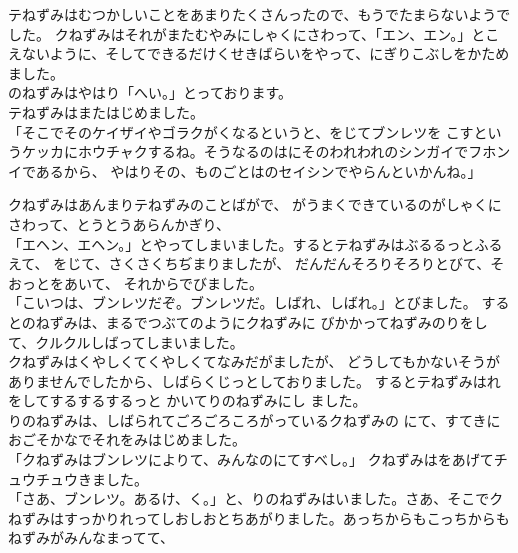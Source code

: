 \documentclass[
    a4paper,
    10pt,
    book]
    {tarticle}
\begin{document}
テねずみはむつかしいことをあまりたくさんったので、もうでたまらないようでした。
クねずみはそれがまたむやみにしゃくにさわって、「エン、エン。」とこえないように、そしてできるだけくせきばらいをやって、にぎりこぶしをかためました。\\
\indent {}のねずみはやはり「へい。」とっております。\\
\indent テねずみはまたはじめました。\\
「そこでそのケイザイやゴラクがくなるというと、をじてブンレツを
こすというケッカにホウチャクするね。そうなるのはにそのわれわれのシンガイでフホンイであるから、
やはりその、ものごとはのセイシンでやらんといかんね。」

\newpage
\thispagestyle{fancy}

\indent クねずみはあんまりテねずみのことばがで、
がうまくできているのがしゃくにさわって、とうとうあらんかぎり、\\
「エヘン、エヘン。」とやってしまいました。するとテねずみはぶるるっとふるえて、
をじて、さくさくちぢまりましたが、
だんだんそろりそろりとびて、そおっとをあいて、
それからでびました。\\
「こいつは、ブンレツだぞ。ブンレツだ。しばれ、しばれ。」とびました。
するとのねずみは、まるでつぶてのようにクねずみに
びかかってねずみのりをして、クルクルしばってしまいました。\\
\indent クねずみはくやしくてくやしくてなみだがましたが、
どうしてもかないそうがありませんでしたから、しばらくじっとしておりました。
するとテねずみはれをしてするするするっと
かいてりのねずみにし
ました。\\
\indent {}りのねずみは、しばられてごろごろころがっているクねずみの
にて、すてきにおごそかなでそれをみはじめました。\\
「クねずみはブンレツによりて、みんなのにてすべし。」
クねずみはをあげてチュウチュウきました。\\
「さあ、ブンレツ。あるけ、く。」と、りのねずみはいました。さあ、そこでクねずみはすっかりれってしおしおとちあがりました。あっちからもこっちからもねずみがみんなまってて、
\end{document}
